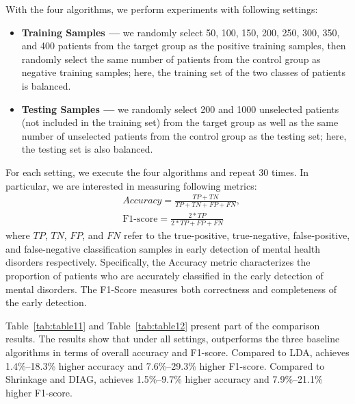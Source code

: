 With the four algorithms, we perform experiments with following settings:
\begin{itemize}
\item \textbf{Training Samples --- } we randomly select 50, 100, 150, 200, 250, 300, 350, and 400 patients from the target group as the positive training samples, then randomly select the same number of patients from the control group as negative training samples; here, the training set of the two classes of patients is balanced.
\item \textbf{Testing Samples --- } we randomly select 200 and 1000 unselected patients (not included in the training set) from the target group as well as the same number of unselected patients from the control group as the testing set; here, the testing set is also balanced.
\end{itemize}
%
For each setting, we execute the four algorithms and repeat 30 times. 
In particular, we are interested in measuring following metrics: 
\begin{equation}
\begin{aligned}
&Accuracy=\frac{TP+TN}{TP+TN+FP+FN},\\
&\text{F1-score}=\frac{2*TP}{2*TP+FP+FN}
\end{aligned}
\end{equation}
where $TP$, $TN$, $FP$, and $FN$ refer to the true-positive, true-negative, false-positive, and false-negative classification samples in early detection of mental health disorders respectively. 
Specifically, the Accuracy metric characterizes the proportion of patients who are accurately classified in the early detection of mental disorders.  The F1-Score measures both correctness and completeness of the early detection. 

Table~\ref{tab:table11} and Table~\ref{tab:table12} present part of the comparison results. 
The results show that under all settings, \TheName{} outperforms the three baseline algorithms in terms of overall accuracy and F1-score. 
Compared to LDA, \TheName{} achieves 1.4\%--18.3\% higher accuracy   and 7.6\%--29.3\% higher F1-score. 
Compared to Shrinkage and DIAG, \TheName{} achieves 
1.5\%--9.7\% higher accuracy and 7.9\%--21.1\% higher F1-score. 
 
